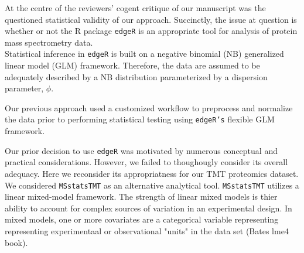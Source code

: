 \documentclass[12pt]{article}
\begin{document}
At the centre of the reviewers' cogent critique of our manuscript 
was the questioned statistical validity of our approach. Succinctly, 
the issue at question is whether or not the R package \texttt{edgeR}
is an appropriate tool for analysis of protein mass spectrometry data.\\

Statistical inference in \texttt{edgeR} is built on a 
negative binomial (NB) generalized linear model (GLM) framework. 
Therefore, the data are assumed to be adequately described by a NB distribution 
parameterized by a dispersion parameter, $\phi$. \footnotemark{} \\


Our previous approach used a customized workflow \footnotemark{} to preprocess
and normalize the data prior to performing statistical testing using
\texttt{edgeR's} flexible GLM framework. \\



Our prior decision to use \texttt{edgeR} was motivated by numerous 
conceptual and practical considerations. However, we failed to thoughougly
consider its overall adequacy. Here we reconsider its  appropriatness for our 
TMT proteomics dataset.  \\

We considered \texttt{MSstatsTMT} as an alternative analytical tool.
\texttt{MSstatsTMT} utilizes a linear mixed-model framework. The strength of 
linear mixed models is thier ability to account for complex sources of variation 
in an experimental design. In mixed models, one or more covariates are a 
categorical variable representing representing experimentaal or observational 
"units" in the data set (Bates lme4 book). \\
\end{document}
